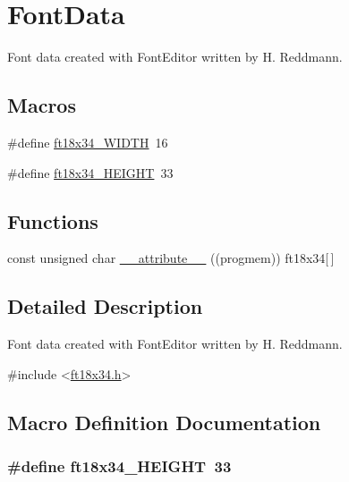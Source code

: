 \hypertarget{group___font_data}{}\section{Font\+Data}
\label{group___font_data}


Font data created with Font\+Editor written by H. Reddmann.  


\subsection*{Macros}
\begin{DoxyCompactItemize}
\item 
\#define \hyperlink{group___font_data_ga9c5a2ac6b7fe6f93a1f018c348ce1ee3}{ft18x34\+\_\+\+W\+I\+D\+T\+H}~16
\item 
\#define \hyperlink{group___font_data_gae29dac2ef91effbbe356546187bfcdeb}{ft18x34\+\_\+\+H\+E\+I\+G\+H\+T}~33
\end{DoxyCompactItemize}
\subsection*{Functions}
\begin{DoxyCompactItemize}
\item 
const unsigned char \hyperlink{group___font_data_ga75bafc35861a8b5fe7b4822408ec2486}{\+\_\+\+\_\+attribute\+\_\+\+\_\+} ((progmem)) ft18x34\mbox{[}$\,$\mbox{]}
\end{DoxyCompactItemize}


\subsection{Detailed Description}
Font data created with Font\+Editor written by H. Reddmann. 


\begin{DoxyCode}
\textcolor{preprocessor}{#include <\hyperlink{ft18x34_8h}{ft18x34.h}>} 
\end{DoxyCode}
 

\subsection{Macro Definition Documentation}
\hypertarget{group___font_data_gae29dac2ef91effbbe356546187bfcdeb}{}
\subsubsection[{ft18x34\+\_\+\+H\+E\+I\+G\+H\+T}]{\setlength{\rightskip}{0pt plus 5cm}\#define ft18x34\+\_\+\+H\+E\+I\+G\+H\+T~33}\label{group___font_data_gae29dac2ef91effbbe356546187bfcdeb}
\hypertarget{group___font_data_ga9c5a2ac6b7fe6f93a1f018c348ce1ee3}{}
